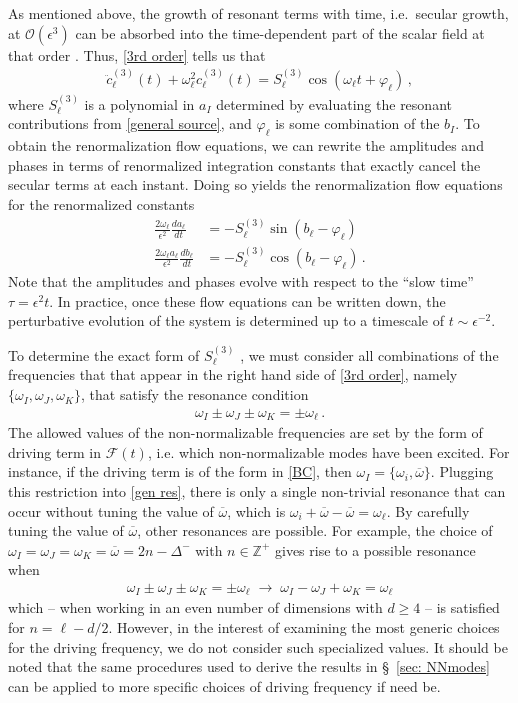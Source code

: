 \documentclass[letterpaper,11pt]{article}
\newcommand{\oi}{\omega_i}
\newcommand{\ol}{\omega_\ell}
\newcommand{\mc}{\mathcal}
\newcommand{\ob}{\overline{\omega}}
\begin{document}
As mentioned above, the growth of resonant terms with time, i.e.~secular growth, at $\mc O(\epsilon^3)$ can be absorbed into the time-dependent part of the scalar field at that order \cite{hep-th/9506161}. Thus, \eqref{3rd order} tells us that
\begin{align}
\ddot c^{(3)}_\ell (t) + \ol^2 c^{(3)}_\ell(t) = S^{(3)}_\ell \cos \left( \ol t + \varphi_\ell \right) \, ,
\end{align}
where $S^{(3)}_\ell$ is a polynomial in $a_I$ determined by evaluating the resonant contributions from \eqref{general source}, and $\varphi_\ell$ is some combination of the $b_I$. To obtain the renormalization flow equations, we can rewrite the amplitudes and phases in terms of renormalized integration constants that exactly cancel the secular terms at each instant. Doing so yields the renormalization flow equations for the renormalized constants~\cite{1407.6273}
\begin{align}
\label{RN flow 1}
\frac{2 \ol}{\epsilon^2} \frac{d a_\ell}{d t} &= - S^{(3)}_\ell \sin \left( b_\ell - \varphi_\ell \right) \\
\label{RN flow 2}
\frac{2 \ol a_\ell}{\epsilon^2} \frac{d b_\ell}{d t} &= - S^{(3)}_\ell \cos \left( b_\ell - \varphi_\ell \right) \, .
\end{align}
Note that the amplitudes and phases evolve with respect to the ``slow time'' $\tau = \epsilon^2 t$. In practice, once these flow equations can be written down, the perturbative evolution of the system is determined up to a timescale of $t \sim \epsilon^{-2}$.

To determine the exact form of $S^{(3)}_\ell\!\!\!$ , we must consider all combinations of the frequencies that that appear in the right hand side of \eqref{3rd order}, namely ${\{ \omega_I, \omega_J, \omega_K\}}$, that satisfy the resonance condition
\begin{align}
\label{gen res}
\omega_I \pm \omega_J \pm \omega_K = \pm \ol \, .
\end{align}
The allowed values of the non-normalizable frequencies are set by the form of driving term in $\mc F(t)$, i.e. which non-normalizable modes have been excited. For instance, if the driving term is of the form in \eqref{BC}, then $\omega_I = \{\omega_i, \ob\}$. Plugging this restriction into \eqref{gen res}, there is only a single non-trivial resonance that can occur without tuning the value of $\ob$, which is $\oi + \ob - \ob = \ol$. By carefully tuning the value of $\ob$, other resonances are possible. For example, the choice of ${ \omega_I = \omega_J = \omega_K =\ob = 2n - \Delta^-}$ with $n \in \mathbb{Z}^+$ gives rise to a possible resonance when
\begin{align}
\omega_I \pm \omega_J \pm \omega_K = \pm \ol \; \to \; \omega_I - \omega_J + \omega_K = \ol
\end{align}
which -- when working in an even number of dimensions with $d \geq 4$ -- is satisfied for $n = \ell - d/2$. However, in the interest of examining the most generic choices for the driving frequency, we do not consider such specialized values. It should be noted that the same procedures used to derive the results in \S\!~\ref{sec: NNmodes} can be applied to more specific choices of driving frequency if need be.
\end{document}
